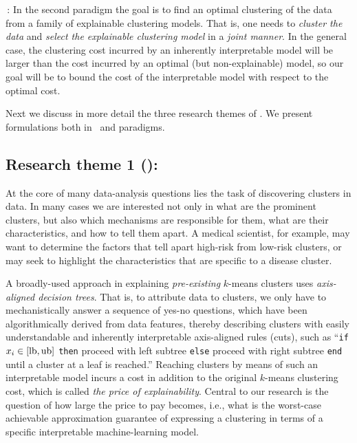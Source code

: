\documentclass[a4paper,11pt]{article}
\begin{document}
\smallskip
{\joint\,:}
In the second paradigm the goal is to find an optimal clustering of the data
from a family of explainable clustering models.
That is, one needs to \emph{cluster the data} and \emph{select the explainable clustering model}
in a \emph{joint manner}.
In the general case, the clustering cost incurred by an inherently interpretable model 
will be larger than the cost incurred by an optimal (but non-explainable) model, 
so our goal will be to bound the cost of the interpretable model with respect to the optimal cost.

\smallskip
Next we discuss in more detail the three research themes of \acronym.
We present formulations both in \posthoc\ and \joint paradigms.


\subsection*{Research theme 1 (\rto): \newmodels}

At the core of many data-analysis questions lies the task of discovering clusters in data. 
In many cases we are interested not only in what are the prominent clusters, 
but also which mechanisms are responsible for them,  
what are their characteristics, and how to tell them apart.  
A medical scientist, for example, may want to determine the factors that tell apart 
high-risk from low-risk clusters, 
or may seek to highlight the characteristics that are specific to a disease cluster.  

A broadly-used \posthoc approach in explaining \emph{pre-existing} $k$-means clusters uses 
\emph{axis-aligned decision trees}. 
That is, to attribute data to clusters, 
we only have to mechanistically answer a sequence of yes-no questions, 
which have been algorithmically derived from data features, 
thereby describing clusters with easily understandable and inherently interpretable axis-aligned rules (cuts), 
such as 
``\texttt{if} $x_i \in [\textnormal{lb}, \textnormal{ub}]$ \texttt{then} 
proceed with left subtree \texttt{else} proceed with right subtree \texttt{end} until a cluster at a leaf is reached.''
Reaching clusters by means of such an interpretable model incurs 
a cost in addition to the original $k$-means clustering cost, 
which is called \emph{the price of explainability}.
Central to our research is the question of how large the price to pay becomes, i.e., 
what is the worst-case achievable approximation guarantee of expressing a clustering 
in terms of a specific interpretable machine-learning model. 
\end{document}

